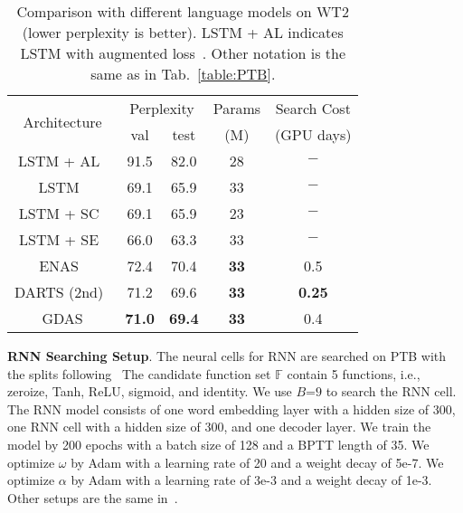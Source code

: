 \documentclass[10pt,twocolumn,letterpaper]{article}
\def\Tabref#1{Tab.~\ref{#1}}
\def\sF{{\mathbb{F}}}
\begin{document}
\begin{table}[t!]
\centering
\setlength{\tabcolsep}{4pt}
\begin{tabular}{| c | c | c | c | c |} \hline\hline

 \multirow{2}{*}{Architecture}          &  \multicolumn{2}{c|}{Perplexity} & Params & Search Cost \\\cline{2-3}
                                        &     val     &      test        & (M)    & (GPU days)  \\ \hline
LSTM + AL~\cite{inan2017tying}          &  91.5       &   82.0           & 28     &   $-$       \\
LSTM~\cite{merity2018regularizing}      &  69.1       &   65.9           & 33     &   $-$       \\
LSTM + SC~\cite{merity2018regularizing} &  69.1       &   65.9           & 23     &   $-$       \\
LSTM + SE~\cite{yang2018breaking}       &  66.0       &   63.3           & 33     &   $-$       \\
\hline\hline
ENAS~\cite{pmlr-v80-pham18a}            &  72.4       &   70.4           &\textbf{33}& 0.5          \\
DARTS (2nd)~\cite{liu2019darts}         &  71.2       &   69.6           &\textbf{33}&\textbf{0.25} \\\hline
GDAS                                    &\textbf{71.0}&\textbf{69.4}     &\textbf{33}& 0.4 \\\hline
\hline
\end{tabular}
\vspace{2mm}
\caption{
Comparison with different language models on WT2 (lower perplexity is better).
LSTM + AL indicates LSTM with augmented loss~\cite{inan2017tying}. Other notation is the same as in \Tabref{table:PTB}.
}
\vspace{-2mm}
\label{table:WT2}
\end{table}



\textbf{RNN Searching Setup}.
The neural cells for RNN are searched on PTB with the splits following~\cite{liu2019darts,pmlr-v80-pham18a}
The candidate function set $\sF$ contain 5 functions, i.e., zeroize, Tanh, ReLU, sigmoid, and identity.
We use $B\text{=}9$ to search the RNN cell.
The RNN model consists of one word embedding layer with a hidden size of 300, one RNN cell with a hidden size of 300, and one decoder layer.
We train the model by 200 epochs with a batch size of 128 and a BPTT length of 35.
We optimize $\omega$ by Adam with a learning rate of 20 and a weight decay of 5e-7.
We optimize $\alpha$ by Adam with a learning rate of 3e-3 and a weight decay of 1e-3.
Other setups are the same in~\cite{pmlr-v80-pham18a,liu2019darts}.
\end{document}
